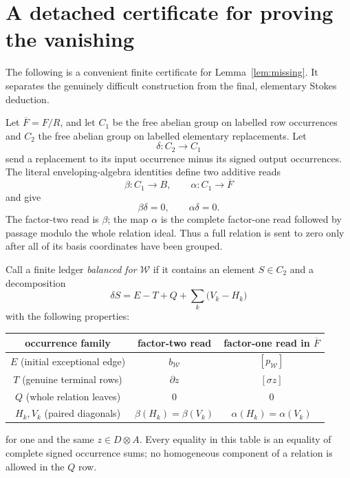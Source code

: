 \documentclass[11pt]{article}
\begin{document}
\section{A detached certificate for proving the vanishing}

The following is a convenient finite certificate for
Lemma~\ref{lem:missing}.  It separates the genuinely difficult construction
from the final, elementary Stokes deduction.

Let $\overline F=F/R$, and let $C_1$ be the free abelian group on labelled
row occurrences and $C_2$ the free abelian group on labelled elementary
replacements.  Let
\[
       \delta:C_2\longrightarrow C_1
\]
send a replacement to its input occurrence minus its signed output
occurrences.  The literal enveloping-algebra identities define two additive
reads
\[
       \beta:C_1\longrightarrow B,
       \qquad
       \alpha:C_1\longrightarrow\overline F
\]
and give
\begin{equation}
                         \beta\delta=0,
       \qquad            \alpha\delta=0.             \label{eq:S0}
\end{equation}
The factor-two read is $\beta$; the map $\alpha$ is the complete factor-one
read followed by passage modulo the whole relation ideal.  Thus a full
relation is sent to zero only after all of its basis coordinates have been
grouped.

Call a finite ledger \emph{balanced for $\mathcal W$} if it contains an
element $S\in C_2$ and a decomposition
\begin{equation}
 \delta S=E-T+Q+
        \sum_{k}\bigl(V_k-H_k\bigr)                 \label{eq:S1}
\end{equation}
with the following properties:
\begin{center}
\begin{tabular}{c|c|c}
occurrence family & factor-two read & factor-one read in $\overline F$\\ \hline
$E$ (initial exceptional edge) & $b_{\mathcal W}$ & $[p_{\mathcal W}]$\\
$T$ (genuine terminal rows) & $\partial z$ & $[\sigma z]$\\
$Q$ (whole relation leaves) & $0$ & $0$\\
$H_k,V_k$ (paired diagonals) & $\beta(H_k)=\beta(V_k)$
  & $\alpha(H_k)=\alpha(V_k)$
\end{tabular}
\end{center}
for one and the same $z\in D\otimes A$.  Every equality in this table is an
equality of complete signed occurrence sums; no homogeneous component of a
relation is allowed in the $Q$ row.
\end{document}
